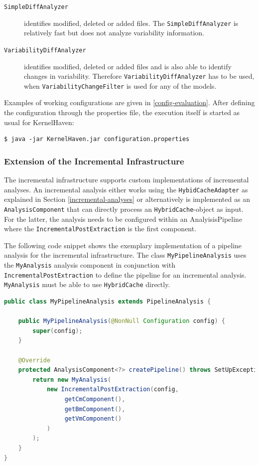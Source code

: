 \documentclass[a4paper]{article}
\begin{document}
\begin{description}
	\item[\texttt{SimpleDiffAnalyzer}] identifies modified, deleted or added files. The \texttt{Simple\-Diff\-Analyzer} is relatively fast but does not analyze variability information.
	\item[\texttt{VariabilityDiffAnalyzer}] identifies modified, deleted or added files and is also able to identify changes in variability. Therefore \texttt{Variability\-Diff\-Analyzer} has to be used, when \texttt{VariabilityChangeFilter} is used for any of the models.
\end{description}


Examples of working configurations are given in \autoref{config-evaluation}. After defining the configuration through the properties file, the execution itself is started as usual for KernelHaven:

\begin{lstlisting}
$ java -jar KernelHaven.jar configuration.properties
\end{lstlisting}



\subsubsection{Extension of the Incremental Infrastructure}

The incremental infrastructure supports custom implementations of incremental analyses. An incremental analysis either works using the \texttt{Hybid\-Cache\-Adapter} as explained in Section \ref{incremental-analyses} or alternatively is implemented as an \texttt{Analysis\-Component} that can directly process an \texttt{Hybrid\-Cache}-object as input. For the latter, the analysis needs to be configured within an AnalyisisPipeline where the \texttt{Incremental\-Post\-Extraction} is the first component.

The following code snippet shows the exemplary implementation of a pipeline analysis for the incremental infrastructure. The class \texttt{MyPipelineAnalysis} uses the \texttt{MyAnalysis} analysis component in conjunction with \texttt{Incremental\-Post\-Extraction} to define the pipeline for an incremental analysis. \texttt{MyAnalysis} must be able to use \texttt{HybridCache} directly.

\begin{lstlisting}[language=java]
public class MyPipelineAnalysis extends PipelineAnalysis {

	public MyPipelineAnalysis(@NonNull Configuration config) {
		super(config);
	}
	
	@Override
	protected AnalysisComponent<?> createPipeline() throws SetUpException {
		return new MyAnalysis(
		    new IncrementalPostExtraction(config, 
		         getCmComponent(), 
		         getBmComponent(), 
		         getVmComponent()
		    )
		);
	}
}
\end{lstlisting}
\end{document}
